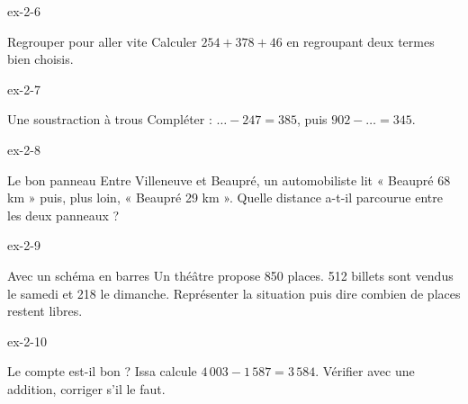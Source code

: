\begin{blocLivre}{ex-2-6}\begin{exercice}[2]{Regrouper pour aller vite}
Calculer $254+378+46$ en regroupant deux termes bien choisis.
\end{exercice}\end{blocLivre}
\begin{blocLivre}{ex-2-7}\begin{exercice}[2]{Une soustraction à trous}
Compléter : $\ldots-247=385$, puis $902-\ldots=345$.
\end{exercice}\end{blocLivre}
\begin{blocLivre}{ex-2-8}\begin{exercice}[2]{Le bon panneau}
Entre Villeneuve et Beaupré, un automobiliste lit « Beaupré 68 km » puis, plus loin, « Beaupré 29 km ». Quelle distance a-t-il parcourue entre les deux panneaux ?
\end{exercice}\end{blocLivre}
\begin{blocLivre}{ex-2-9}\begin{exercice}[2]{Avec un schéma en barres}
Un théâtre propose 850 places. 512 billets sont vendus le samedi et 218 le dimanche. Représenter la situation puis dire combien de places restent libres.
\label{fig-ex-2-9}
\end{exercice}\end{blocLivre}
\begin{blocLivre}{ex-2-10}\begin{exercice}[2]{Le compte est-il bon ?}
Issa calcule $4\,003-1\,587=3\,584$. Vérifier avec une addition, corriger s’il le faut.
\end{exercice}\end{blocLivre}

